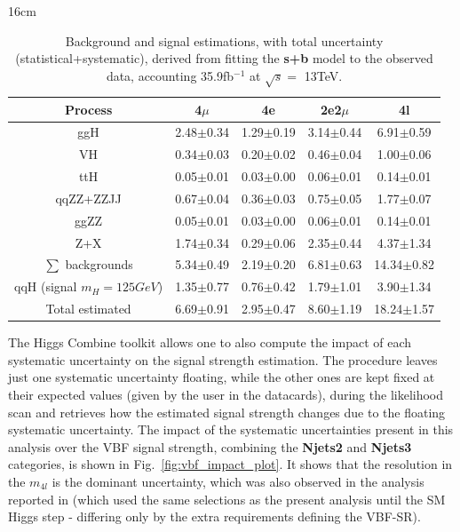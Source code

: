 \begin{table}[hbtp]{16cm}
	\caption{Background and signal estimations, with total uncertainty (statistical+systematic), derived from fitting the \textbf{s+b} model to the observed data, accounting 35.9fb$^{-1}$ at $\sqrt{s}=$ 13TeV.}
	\centering
	\begin{tabular}{c|c|c|c|c}
		\hline
		\rowcolor{light_gray}
		Process                     & 4$\mu$        & 4e            & 2e2$\mu$      & 4l\\
		\hline
		ggH                         & 2.48$\pm$0.34 & 1.29$\pm$0.19 & 3.14$\pm$0.44 & 6.91$\pm$0.59\\
		VH                          & 0.34$\pm$0.03 & 0.20$\pm$0.02 & 0.46$\pm$0.04 & 1.00$\pm$0.06\\
		ttH                         & 0.05$\pm$0.01 & 0.03$\pm$0.00 & 0.06$\pm$0.01 & 0.14$\pm$0.01\\
		qqZZ+ZZJJ                   & 0.67$\pm$0.04 & 0.36$\pm$0.03 & 0.75$\pm$0.05 & 1.77$\pm$0.07\\
		ggZZ                        & 0.05$\pm$0.01 & 0.03$\pm$0.00 & 0.06$\pm$0.01 & 0.14$\pm$0.01\\
		Z+X                         & 1.74$\pm$0.34 & 0.29$\pm$0.06 & 2.35$\pm$0.44 & 4.37$\pm$1.34\\
		\hline
		$\sum$ backgrounds          & 5.34$\pm$0.49 & 2.19$\pm$0.20 & 6.81$\pm$0.63 & 14.34$\pm$0.82\\
		\hline
		qqH (signal $m_{H}=125GeV$) & 1.35$\pm$0.77 & 0.76$\pm$0.42 & 1.79$\pm$1.01 &  3.90$\pm$1.34\\
		\hline
		Total estimated              & 6.69$\pm$0.91 & 2.95$\pm$0.47 & 8.60$\pm$1.19 & 18.24$\pm$1.57\\
		\hline
	\end{tabular}
	\label{tab:yields_uncertainties_postfit}
\end{table}

The Higgs Combine toolkit allows one to also compute the impact of each systematic uncertainty on the signal strength estimation. The procedure leaves just one systematic uncertainty floating, while the other ones are kept fixed at their expected values (given by the user in the datacards), during the likelihood scan and retrieves how the estimated signal strength changes due to the floating systematic uncertainty. The impact of the systematic uncertainties present in this analysis over the VBF signal strength, combining the \textbf{Njets2} and \textbf{Njets3} categories, is shown in Fig.~\ref{fig:vbf_impact_plot}. It shows that the resolution in the $m_{4l}$ is the dominant uncertainty, which was also observed in the analysis reported in \cite{bib:CMS-AN-16-328} (which used the same selections as the present analysis until the SM Higgs step - differing only by the extra requirements defining the VBF-SR).

